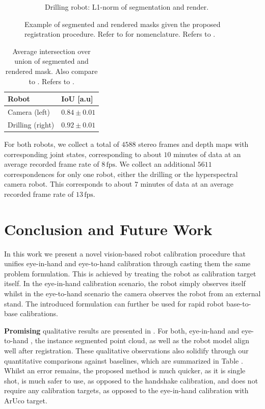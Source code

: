 \begin{figure}
\begin{subfigure}[b]{0.32\textwidth}
        \caption{Drilling robot: L1-norm of segmentation and render.}
    \end{subfigure}
    \caption{Example of segmented and rendered masks given the proposed registration procedure. Refer to  for nomenclature. Refers to .}
    \label{c1:fig:masks}
\end{figure}

\begin{table}[tb]
\centering
\caption{Average intersection over union of segmented and rendered mask. Also compare to . Refers to .}
\label{c1:tab:iou}
\begin{tabular}{@{}ll@{}}
\toprule
Robot         & IoU {[}a.u{]}   \\ \midrule
Camera (left)    & $0.84 \pm 0.01$ \\
Drilling (right) & $0.92 \pm 0.01$ \\ \bottomrule
\end{tabular}
\end{table}



For both robots, we collect a total of $4588$ stereo frames and depth maps with corresponding joint states, corresponding to about $10$ minutes of data at an average recorded frame rate of $8\,\text{fps}$. We collect an additional $5611$ correspondences for only one robot, either the drilling or the hyperspectral camera robot. This corresponds to about $7$ minutes of data at an average recorded frame rate of $13\,\text{fps}$.

\section{Conclusion and Future Work}%
In this work we present a novel vision-based robot calibration procedure that unifies eye-in-hand and eye-to-hand calibration through casting them the same problem formulation. This is achieved by treating the robot as calibration target itself. In the eye-in-hand calibration scenario, the robot simply observes itself whilst in the eye-to-hand scenario the camera observes the robot from an external stand. The introduced formulation can further be used for rapid robot base-to-base calibrations.

\textbf{Promising} qualitative results are presented in . For both, eye-in-hand  and eye-to-hand , the instance segmented point cloud, as well as the robot model align well after registration. These qualitative observations also solidify through our quantitative comparisons against baselines, which are summarized in Table . Whilst an error remains, the proposed method is much quicker, as it is single shot, is much safer to use, as opposed to the handshake calibration, and does not require any calibration targets, as opposed to the eye-in-hand calibration with ArUco target.

